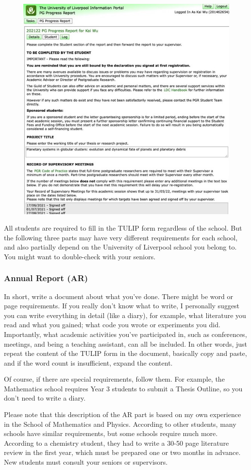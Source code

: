 \begin{figure}[H]
    \includegraphics[width=0.7\columnwidth, center]{author-folder/Kai.Wu/TULIP.jpg}
\end{figure}

All students are required to fill in the TULIP form regardless of the school. But the following three parts may have very different requirements for each school, and also partially depend on the University of Liverpool school you belong to. You might want to double-check with your seniors.

\subsubsection{Annual Report (AR)}
In short, write a document about what you've done. There might be word or page requirements. If you really don't know what to write, I personally suggest you can write everything in detail (like a diary), for example, what literature you read and what you gained; what code you wrote or experiments you did. Importantly, what academic activities you've participated in, such as conferences, meetings, and being a teaching assistant, can all be included. In other words, just repeat the content of the TULIP form in the document, basically copy and paste, and if the word count is insufficient, expand the content.

Of course, if there are special requirements, follow them. For example, the Mathematics school requires Year 3 students to submit a Thesis Outline, so you don't need to write a diary.

Please note that this description of the AR part is based on my own experience in the School of Mathematics and Physics. According to other students, many schools have similar requirements, but some schools require much more. According to a chemistry student, they had to write a 30-50 page literature review in the first year, which must be prepared one or two months in advance. New students must consult your seniors or supervisors.

